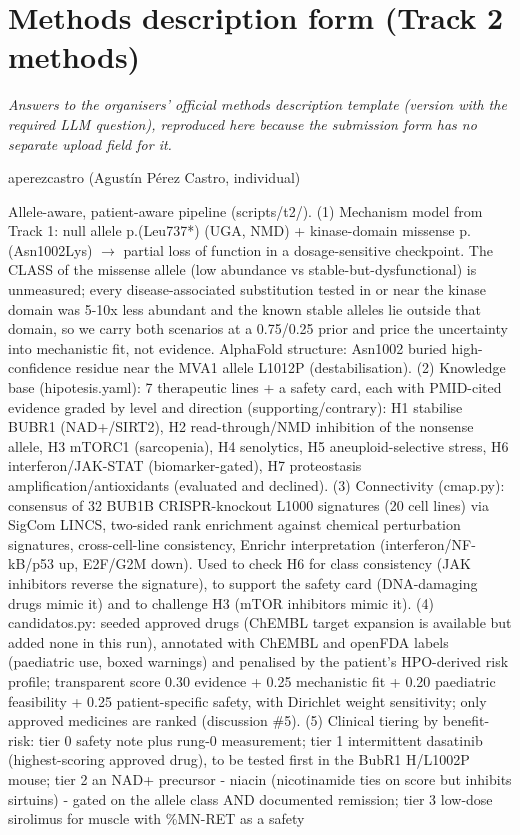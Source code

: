 \section{Methods description form (Track 2 methods)}
\textit{Answers to the organisers' official methods description template (version with the required LLM question), reproduced here because the submission form has no separate upload field for it.}

\begin{description}[leftmargin=0pt,style=nextline,itemsep=4pt,font=\sffamily\bfseries\small\color{branddark}]
\item[Team name] aperezcastro (Agustín Pérez Castro, individual)
\item[Please describe your approach in detail (how you went from variant/mechanism to candidate medication(s)).] Allele-aware, patient-aware pipeline (scripts/t2/). (1) Mechanism model from Track 1: null allele p.(Leu737*) (UGA, NMD) + kinase-domain missense p.(Asn1002Lys) $\rightarrow$ partial loss of function in a dosage-sensitive checkpoint. The CLASS of the missense allele (low abundance vs stable-but-dysfunctional) is unmeasured; every disease-associated substitution tested in or near the kinase domain was 5-10x less abundant and the known stable alleles lie outside that domain, so we carry both scenarios at a 0.75/0.25 prior and price the uncertainty into mechanistic fit, not evidence. AlphaFold structure: Asn1002 buried high-confidence residue near the MVA1 allele L1012P (destabilisation). (2) Knowledge base (hipotesis.yaml): 7 therapeutic lines + a safety card, each with PMID-cited evidence graded by level and direction (supporting/contrary): H1 stabilise BUBR1 (NAD+/SIRT2), H2 read-through/NMD inhibition of the nonsense allele, H3 mTORC1 (sarcopenia), H4 senolytics, H5 aneuploid-selective stress, H6 interferon/JAK-STAT (biomarker-gated), H7 proteostasis amplification/antioxidants (evaluated and declined). (3) Connectivity (cmap.py): consensus of 32 BUB1B CRISPR-knockout L1000 signatures (20 cell lines) via SigCom LINCS, two-sided rank enrichment against chemical perturbation signatures, cross-cell-line consistency, Enrichr interpretation (interferon/NF-kB/p53 up, E2F/G2M down). Used to check H6 for class consistency (JAK inhibitors reverse the signature), to support the safety card (DNA-damaging drugs mimic it) and to challenge H3 (mTOR inhibitors mimic it). (4) candidatos.py: seeded approved drugs (ChEMBL target expansion is available but added none in this run), annotated with ChEMBL and openFDA labels (paediatric use, boxed warnings) and penalised by the patient's HPO-derived risk profile; transparent score 0.30 evidence + 0.25 mechanistic fit + 0.20 paediatric feasibility + 0.25 patient-specific safety, with Dirichlet weight sensitivity; only approved medicines are ranked (discussion \#5). (5) Clinical tiering by benefit-risk: tier 0 safety note plus rung-0 measurement; tier 1 intermittent dasatinib (highest-scoring approved drug), to be tested first in the BubR1 H/L1002P mouse; tier 2 an NAD+ precursor - niacin (nicotinamide ties on score but inhibits sirtuins) - gated on the allele class AND documented remission; tier 3 low-dose sirolimus for muscle with \%MN-RET as a safety 
\end{description}
